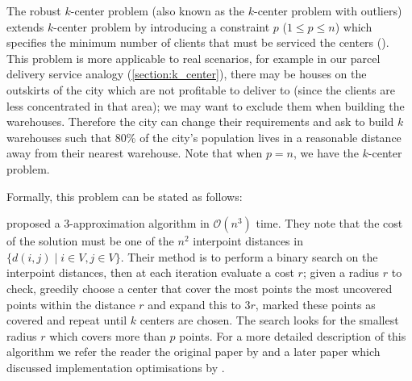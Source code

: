 The robust $k$-center problem (also known as the $k$-center problem with outliers) extends $k$-center problem by introducing a constraint \(p\) (\(1 \leq p \leq n \)) which specifies the minimum number of clients that must be serviced the centers (\cite{charikar_algorithms_2001}). This problem is more applicable to real scenarios, for example in our parcel delivery service analogy (\cref{section:k_center}), there may be houses on the outskirts of the city which are not profitable to deliver to (since the clients are less concentrated in that area); we may want to exclude them when building the warehouses. Therefore the city can change their requirements and ask to build $k$ warehouses such that 80\% of the city's population lives in a reasonable distance away from their nearest warehouse. Note that when \(p=n\), we have the $k$-center problem.

Formally, this problem can be stated as follows:


\citeauthor{charikar_algorithms_2001} proposed a 3-approximation algorithm in $\mathcal{O}(n^{3})$ time. They note that the cost of the solution must be one of the $n^{2}$ interpoint distances in $\{d(i,j)\mid i\in V, j\in V\}$. Their method is to perform a binary search on the interpoint distances, then at each iteration evaluate a cost $r$; given a radius $r$ to check, greedily choose a center that cover the most points the most uncovered points within the distance $r$ and expand this to $3r$, marked these points as covered and repeat until $k$ centers are chosen. The search looks for the smallest radius $r$ which covers more than $p$ points. For a more detailed description of this algorithm we refer the reader the original paper by \textcite{charikar_algorithms_2001} and a later paper which discussed implementation optimisations by \textcite{schwartz_efficient_2010}.